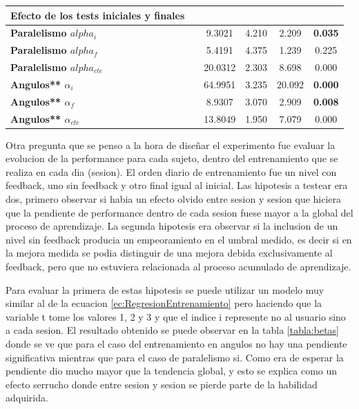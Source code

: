 \documentclass{article}
\begin{document}
\begin{table}
\begin{center}
\begin{tabular}{lccccc}
\midrule
\textbf{Efecto de los tests iniciales y finales} &&&&\\
\midrule
\textbf{Paralelismo $alpha_i$} & & 9.3021    &  4.210   &   2.209   &   \textbf{0.035}  \\%
\textbf{Paralelismo $alpha_f$} & & 5.4191    &   4.375  &    1.239  &    0.225 \\%
\textbf{Paralelismo $alpha_{cte}$} & & 20.0312  &    2.303  &    8.698  &    0.000  \\%
\textbf{Angulos** $\alpha_i$} & & 64.9951   &   3.235  &   20.092  & \textbf{0.000} \\%
\textbf{Angulos** $\alpha_f$} & & 8.9307    &   3.070  &    2.909  &    \textbf{0.008}   \\%
\textbf{Angulos** $\alpha_{cte}$} & & 13.8049   &   1.950  &    7.079  &    0.000  \\%


\bottomrule
\end{tabular}

\end{center}

\end{table}

Otra pregunta que se penso a la hora de diseñar el experimento fue evaluar la evolucion de la performance para cada sujeto, dentro del entrenamiento que se realiza en cada dia (sesion). El orden diario de entrenamiento fue un nivel con feedback, uno sin feedback y otro final igual al inicial. Las hipotesis a testear era dos, primero observar si habia un efecto olvido entre sesion y sesion que hiciera que la pendiente de performance dentro de cada sesion fuese mayor a la global del proceso de aprendizaje. La segunda hipotesis era observar si la inclusion de un nivel sin feedback producia un empeoramiento en el umbral medido, es decir si en la mejora medida se podia distinguir de una mejora debida exclusivamente al feedback, pero que no estuviera relacionada al proceso acumulado de aprendizaje. 

Para evaluar la primera de estas hipotesis se puede utilizar un modelo muy similar al de la ecuacion \ref{ec:RegresionEntrenamiento} pero haciendo que la variable t tome los valores 1, 2 y 3 y que el indice i represente no al usuario sino a cada sesion. El resultado obtenido se puede observar en la tabla \ref{tabla:betas} donde se ve que para el caso del entrenamiento en angulos no hay una pendiente significativa mientras que para el caso de paralelismo si. Como era de esperar la pendiente dio mucho mayor que la tendencia global, y esto se explica como un efecto serrucho donde entre sesion y sesion se pierde parte de la habilidad adquirida. 
\end{document}
